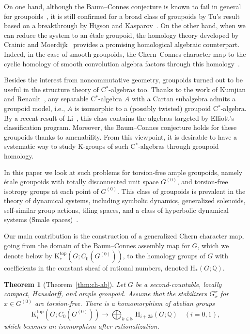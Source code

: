 \documentclass[a4paper,reqno]{amsart}
\theoremstyle{plain}
\newtheorem{theoremA}{Theorem}
\theoremstyle{definition}
\theoremstyle{remark}
\numberwithin{equation}{section}
\newcommand{\rH}{\mathrm{H}}
\newcommand{\rK}{\mathrm{K}}
\newcommand{\dN}{\mathbb{N}}
\newcommand{\dQ}{\mathbb{Q}}
\begin{document}
On one hand, although the Baum--Connes conjecture is known to fail in general for groupoids~\cite{MR1911663}, it is still confirmed for a broad class of groupoids by Tu's result~\cite{tu:moy} based on a breakthrough by Higson and Kasparov~\cite{higkas:bc}.
On the other hand, when we can reduce the system to an étale groupoid, the homology theory developed by Crainic and Moerdijk~\cite{cramo:hom} provides a promising homological algebraic counterpart.
Indeed, in the case of smooth groupoids, the Chern--Connes character map to the cyclic homology of smooth convolution algebra factors through this homology~\cite{MR1706117}.

Besides the interest from noncommutative geometry, groupoids turned out to be useful in the structure theory of C$^*$-algebras too.
Thanks to the work of Kumjian and Renault~\cites{kum:diag,ren:cartan}, any separable C$^*$-algebra $A$ with a Cartan subalgebra admits a groupoid model, i.e., $A$ is isomorphic to a (possibly twisted) groupoid C$^*$-algebra.
By a recent result of Li~\cite{li:diag}, this class contains the algebras targeted by Elliott's classification program.
Moreover, the Baum--Connes conjecture holds for these groupoids thanks to amenability.
From this viewpoint, it is desirable to have a systematic way to study $\rK$-groups of such C$^*$-algebras through groupoid homology.

\smallskip

In this paper we look at such problems for torsion-free ample groupoids, namely étale groupoids with totally disconnected unit space $G^{(0)}$, and torsion-free isotropy groups at each point of $G^{(0)}$.
This class of groupoids is prevalent in the theory of dynamical systems, including symbolic dynamics, generalized solenoids, self-similar group actions, tiling spaces, and a class of hyperbolic dynamical systems (Smale spaces)~\cites{kelput:til,nekra:crelle,bm:hom}. 

Our main contribution is the construction of a generalized Chern character map, going from the domain of the Baum--Connes assembly map for $G$, which we denote below by $\rK_*^{\mathrm{top}}(G; C_0(G^{(0)}))$, to the homology groups of $G$ with coefficients in the constant sheaf of rational numbers, denoted $\rH_{\ast}(G; \dQ)$.

\begin{theoremA}[Theorem~\ref{thm:ch-ab}]\label{thm:a-def-ch}
Let $G$ be a second-countable, locally compact, Hausdorff, and ample groupoid. Assume that the stabilizers $G^x_x$ for $x \in G^{(0)}$ are torsion-free.
There is a homomorphism of abelian groups
\begin{equation*}%
\rK_i^{\mathrm{top}}(G; C_0(G^{(0)})) \to \bigoplus_{k\in \dN} \rH_{i + 2k}(G; \dQ) \quad (i = 0, 1),
\end{equation*}
which becomes an isomorphism after rationalization.
\end{theoremA}
\end{document}
